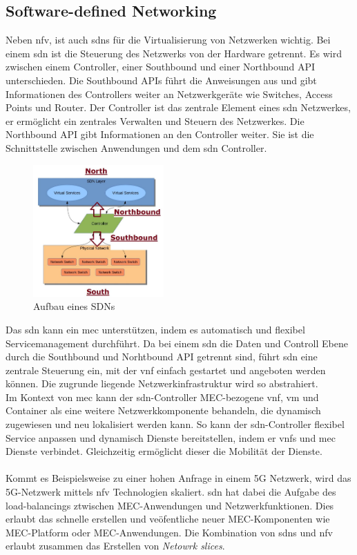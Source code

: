 \documentclass[runningheads]{llncs}
\numberwithin{figure}{section}
\begin{document}
\subsection{Software-defined Networking}
\label{subsec:Software-defined Networking}
Neben \acrshort{nfv}, ist auch \acrlong{sdn}s für die Virtualisierung von Netzwerken wichtig.
Bei einem \acrshort{sdn} ist die Steuerung des Netzwerks von der Hardware getrennt. Es wird zwischen einem Controller, 
einer Southbound und einer Northbound API unterschieden. 
Die Southbound APIs führt die Anweisungen aus und gibt Informationen des Controllers weiter an Netzwerkgeräte wie Switches,
Access Points und Router. Der Controller ist das zentrale Element eines \acrshort{sdn} Netzwerkes, 
er ermöglicht ein zentrales Verwalten und Steuern des 
Netzwerkes. Die Northbound API gibt Informationen an den Controller weiter. Sie ist die Schnittstelle zwischen Anwendungen 
und dem \acrshort{sdn} Controller.\cite{SoftwareDefinedNetworkingSDN}
\begin{figure}
  \includegraphics[width=5cm]{images/SDN-Northbound-and-Southbound-Interfaces-Hong-2014.png}
  \caption{Aufbau eines SDNs}
  \label{fig:sdn}
\end{figure}
Das \acrlong{sdn} kann ein \acrshort{mec} unterstützen, indem es automatisch und flexibel Servicemanagement durchführt.
Da bei einem \acrshort{sdn} die Daten und Controll Ebene durch die Southbound und Norhtbound API getrennt sind, 
führt \acrshort{sdn} eine zentrale Steuerung ein, 
mit der \acrshort{vnf} einfach gestartet und angeboten werden können. 
Die zugrunde liegende Netzwerkinfrastruktur wird so abstrahiert. \\
Im Kontext von \acrshort{mec} kann der \acrshort{sdn}-Controller MEC-bezogene \acrshort{vnf}, 
\acrshort{vm} und Container als eine weitere Netzwerkkomponente behandeln, die dynamisch zugewiesen und neu lokalisiert werden kann.
So kann der \acrshort{sdn}-Controller flexibel Service anpassen und dynamisch Dienste bereitstellen, indem er \acrshort{vnf}s und  \acrshort{mec} Dienste verbindet.
Gleichzeitig  ermöglicht dieser die Mobilität der Dienste.
\\
\\
Kommt es Beispielsweise zu einer hohen Anfrage in einem 5G Netzwerk, wird das 5G-Netzwerk mittels \acrshort{nfv} Technologien skaliert.
\acrshort{sdn} hat dabei die Aufgabe des load-balancings ztwischen MEC-Anwendungen und Netzwerkfunktionen. Dies erlaubt das 
schnelle erstellen und veöfentliche neuer MEC-Komponenten wie MEC-Platform oder MEC-Anwendungen.
Die Kombination von \acrshort{sdn}s und \acrshort{nfv} erlaubt zusammen das Erstellen von \textit{Netowrk slices}. 
\end{document}
